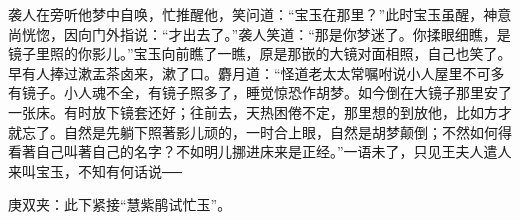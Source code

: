 \begin{parag}
    袭人在旁听他梦中自唤，忙推醒他，笑问道：“宝玉在那里？”此时宝玉虽醒，神意尚恍惚，因向门外指说：“才出去了。”袭人笑道：“那是你梦迷了。你揉眼细瞧，是镜子里照的你影儿。”宝玉向前瞧了一瞧，原是那嵌的大镜对面相照，自己也笑了。早有人捧过漱盂茶卤来，漱了口。麝月道：“怪道老太太常嘱咐说小人屋里不可多有镜子。小人魂不全，有镜子照多了，睡觉惊恐作胡梦。如今倒在大镜子那里安了一张床。有时放下镜套还好；往前去，天热困倦不定，那里想的到放他，比如方才就忘了。自然是先躺下照著影儿顽的，一时合上眼，自然是胡梦颠倒；不然如何得看著自己叫著自己的名字？不如明儿挪进床来是正经。”一语未了，只见王夫人遣人来叫宝玉，不知有何话说──\begin{note}庚双夹：此下紧接“慧紫鹃试忙玉”。\end{note}
\end{parag}
